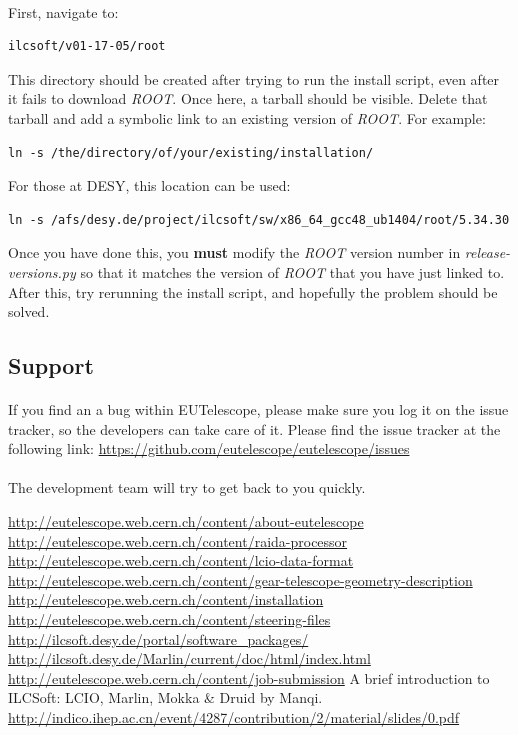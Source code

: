 \documentclass[11pt]{article}
\begin{document}
\paragraph{}
First, navigate to:
\begin{verbatim}
ilcsoft/v01-17-05/root
\end{verbatim}
This directory should be created after trying to run the install script, even after it fails to download \textit{ROOT}. Once here, a tarball should be visible. Delete that tarball and add a symbolic link to an existing version of \textit{ROOT}. For example:
\begin{verbatim}
ln -s /the/directory/of/your/existing/installation/
\end{verbatim}
For those at DESY, this location can be used:
\begin{verbatim}
ln -s /afs/desy.de/project/ilcsoft/sw/x86_64_gcc48_ub1404/root/5.34.30
\end{verbatim}
Once you have done this, you \textbf{must} modify the \textit{ROOT} version number in \textit{release-versions.py} so that it matches the version of \textit{ROOT} that you have just linked to. After this, try rerunning the install script, and hopefully the problem should be solved.
\subsection{Support}
\paragraph{}
If you find an a bug within EUTelescope, please make sure you log it on the issue tracker, so the developers can take care of it. Please find the issue tracker at the following link:
\url{https://github.com/eutelescope/eutelescope/issues}
\paragraph{}
The development team will try to get back to you quickly.



\newpage
\begin{thebibliography}{9}
\bibitem{}
\url{http://eutelescope.web.cern.ch/content/about-eutelescope}
\bibitem{}
\url{http://eutelescope.web.cern.ch/content/raida-processor}
\bibitem{}
\url{http://eutelescope.web.cern.ch/content/lcio-data-format}
\bibitem{}
\url{http://eutelescope.web.cern.ch/content/gear-telescope-geometry-description}
\bibitem{}
\url{http://eutelescope.web.cern.ch/content/installation}
\bibitem{}
\url{http://eutelescope.web.cern.ch/content/steering-files}
\bibitem{}
\url{http://ilcsoft.desy.de/portal/software_packages/}
\bibitem{}
\url{http://ilcsoft.desy.de/Marlin/current/doc/html/index.html}
\bibitem{}
\url{http://eutelescope.web.cern.ch/content/job-submission}
\bibitem{}
A brief introduction to ILCSoft: LCIO, Marlin, Mokka \& Druid by Manqi.
\url{http://indico.ihep.ac.cn/event/4287/contribution/2/material/slides/0.pdf}
\end{thebibliography}
\end{document}
